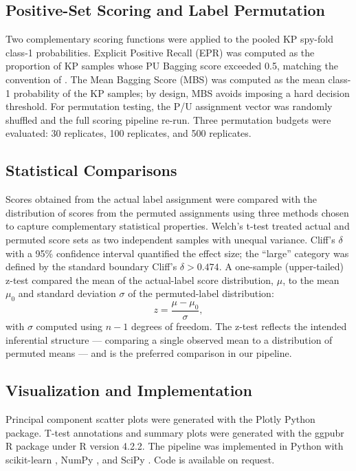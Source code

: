 \documentclass[11pt]{article}
\begin{document}
\subsection{Positive-Set Scoring and Label Permutation}

Two complementary scoring functions were applied to the pooled KP spy-fold class-1 probabilities. Explicit Positive Recall (EPR) was computed as the proportion of KP samples whose PU Bagging score exceeded 0.5, matching the convention of \cite{cheng2015epr}. The Mean Bagging Score (MBS) was computed as the mean class-1 probability of the KP samples; by design, MBS avoids imposing a hard decision threshold. For permutation testing, the P/U assignment vector was randomly shuffled and the full scoring pipeline re-run. Three permutation budgets were evaluated: 30 replicates, 100 replicates, and 500 replicates.

\subsection{Statistical Comparisons}

Scores obtained from the actual label assignment were compared with the distribution of scores from the permuted assignments using three methods chosen to capture complementary statistical properties. Welch's t-test treated actual and permuted score sets as two independent samples with unequal variance. Cliff's $\delta$ with a 95\% confidence interval \cite{cliff1993dominance} quantified the effect size; the ``large'' category was defined by the standard boundary Cliff's $\delta > 0.474$. A one-sample (upper-tailed) z-test compared the mean of the actual-label score distribution, $\mu$, to the mean $\mu_0$ and standard deviation $\sigma$ of the permuted-label distribution:
\begin{equation}
  z = \frac{\mu - \mu_0}{\sigma},
\end{equation}
with $\sigma$ computed using $n-1$ degrees of freedom. The z-test reflects the intended inferential structure --- comparing a single observed mean to a distribution of permuted means --- and is the preferred comparison in our pipeline.

\subsection{Visualization and Implementation}

Principal component scatter plots were generated with the Plotly Python package. T-test annotations and summary plots were generated with the ggpubr R package under R version 4.2.2. The pipeline was implemented in Python with scikit-learn \cite{pedregosa2011scikit,abraham2014scikit}, NumPy \cite{harris2020numpy}, and SciPy \cite{virtanen2020scipy}. Code is available on request.
\end{document}
